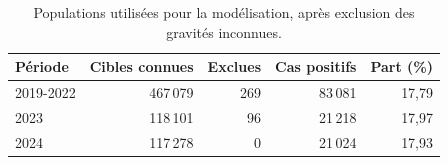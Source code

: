 \begin{table}[htbp]
\centering\small
\renewcommand{\arraystretch}{1.18}
\caption{Populations utilisées pour la modélisation, après exclusion des gravités inconnues.}\label{tab:ml-population}
\begin{tabular*}{\textwidth}{@{\extracolsep{\fill}}lrrrr@{}}
\toprule
Période & Cibles connues & Exclues & Cas positifs & Part (\%) \\
\midrule
2019-2022 & 467\,079 & 269 & 83\,081 & 17,79 \\
2023 & 118\,101 & 96 & 21\,218 & 17,97 \\
2024 & 117\,278 & 0 & 21\,024 & 17,93 \\
\bottomrule
\end{tabular*}
\end{table}
